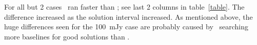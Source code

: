 %

For all but 2 cases \KR\ ran faster than \FR; see last 2 columns in
table~\ref{table}.  The difference increased as the solution interval
increased.  As
mentioned above, the huge differences seen for the 100~mJy case are
probably caused by \FR\ searching more baselines for good solutions
than \KR\@.

